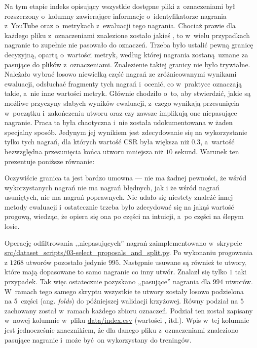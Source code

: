 Na tym etapie indeks opisujący wszystkie dostępne pliki z~oznaczeniami był rozszerzony o~kolumny zawierające informacje o~identyfikatorze nagrania z~YouTube oraz o~metrykach z~ewaluacji tego nagrania. Chociaż prawie dla każdego pliku z~oznaczeniami znalezione zostało jakieś , to w~wielu przypadkach nagranie to zupełnie nie pasowało do oznaczeń. Trzeba było ustalić pewną granicę decyzyjną, opartą o~wartości metryk, według której nagrania zostaną uznane za pasujące do plików z~oznaczeniami. Znalezienie takiej granicy nie było trywialne. Należało wybrać losowo niewielką część nagrań ze zróżnicowanymi wynikami ewaluacji, odsłuchać fragmenty tych nagrań i~ocenić, co w~praktyce oznaczają takie, a~nie inne wartości metryk. Głównie chodziło o~to, aby stwierdzić, jakie są możliwe przyczyny słabych wyników ewaluacji, z~czego wynikają przesunięcia w~początku i~zakończeniu utworu oraz czy zawsze implikują one niepasujące nagranie. Praca ta była chaotyczna i~nie została udokumentowana w żaden specjalny sposób. Jedynym jej wynikiem jest zdecydowanie się na wykorzystanie tylko tych nagrań, dla których wartość CSR była większa niż $0.3$, a~wartość bezwzględna przesunięcia końca utworu mniejsza niż $10$ sekund. Warunek ten prezentuje poniższe równanie:
\begin{center}
\end{center}
Oczywiście granica ta jest bardzo umowna --- nie ma żadnej pewności, że wśród wykorzystanych nagrań nie ma nagrań błędnych, jak i że wśród nagrań usuniętych, nie ma nagrań poprawnych. Nie udało się niestety znaleźć innej metody ewaluacji i~ostatecznie trzeba było zdecydować się na jakąś wartość progową, wiedząc, że opiera się ona po części na intuicji, a~po części na ślepym losie.

Operację odfiltrowania ,,niepasujących'' nagrań zaimplementowano w~skrypcie \url{src/dataset_scripts/03-select_proposals_and_split.py}. Po wykonaniu progowania z $1268$ utworów pozostało jedynie $995$. Następnie usuwane są również te utwory, które mają dopasowane to samo nagranie co inny utwór. Znalazł się tylko $1$ taki przypadek. Tak więc ostatecznie pozyskano ,,pasujące'' nagrania dla $994$ utworów. W~ramach tego samego skryptu wszystkie te utwory zostały losowo podzielona na 5~części (ang. \emph{folds}) do późniejszej walidacji krzyżowej. Równy podział na $5$ zachowany został w~ramach każdego zbioru oznaczeń. Podział ten został zapisany w~nowej kolumnie  w~pliku \url{data/index.csv} (wartości ,  itd.). Wpis w~tej kolumnie jest jednocześnie znacznikiem, że dla danego pliku z~oznaczeniami znaleziono pasujące nagranie i~może być on wykorzystany do treningów.

